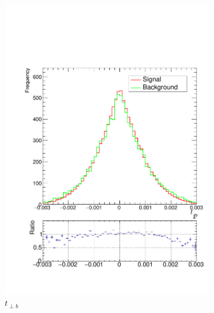 \documentclass[10pt,a4paper]{book}
\begin{document}
\begin{figure}
\begin{subfigure}{0.33\textwidth}
\includegraphics[scale=0.25]{reco/tper2}
\caption{$t_{\perp b}$}
\end{subfigure}
\begin{subfigure}{.33\textwidth}
\centering

\end{subfigure}
\end{figure}
\end{document}
